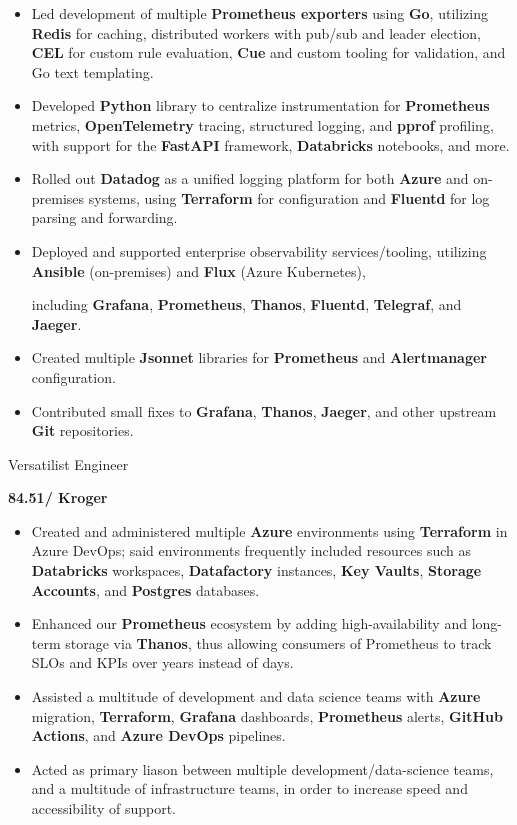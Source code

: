 \documentclass[10pt,a4paper,ragged2e,withhyper,hidelinks]{altacv}
\newcommand{\cveventinv}[4]{%
  {\large\color{emphasis}#1\par}
  \smallskip\normalsize
  \ifstrequal{#2}{}{}{
  \textbf{\color{accent}#2}\par
  \smallskip}
  \ifstrequal{#4}{}{}{{\small\color{emphasis}\makebox[0.25\linewidth][l]{\faMapMarker~#4}}}%
  \ifstrequal{#3}{}{}{{\small\color{emphasis}\makebox[0.25\linewidth][l]{\faCalendar~#3}}}\par
  \medskip\normalsize
}
\begin{document}
\begin{itemize}
    \item   \small{Led development of multiple \textbf{Prometheus exporters} using \textbf{Go}, utilizing \textbf{Redis} for caching, distributed workers with pub/sub and leader election, \textbf{CEL} for custom rule evaluation, \textbf{Cue} and custom tooling for validation, and Go text templating.}
    \item   \small{Developed \textbf{Python} library to centralize instrumentation for \textbf{Prometheus} metrics, \textbf{OpenTelemetry} tracing, structured logging, and \textbf{pprof} profiling, with support for the \textbf{FastAPI} framework, \textbf{Databricks} notebooks, and more.}
    \item   \small{Rolled out \textbf{Datadog} as a unified logging platform for both \textbf{Azure} and on-premises systems, using \textbf{Terraform} for configuration and \textbf{Fluentd} for log parsing and forwarding.}
    \item   \small{Deployed and supported enterprise observability services/tooling, utilizing \textbf{Ansible} (on-premises) and \textbf{Flux} (Azure Kubernetes), \par including \textbf{Grafana}, \textbf{Prometheus}, \textbf{Thanos}, \textbf{Fluentd}, \textbf{Telegraf}, and \textbf{Jaeger}.}
    \item   \small{Created multiple \textbf{Jsonnet} libraries for \textbf{Prometheus} and \textbf{Alertmanager} configuration.}
    \item   \small{Contributed small fixes to \textbf{Grafana}, \textbf{Thanos}, \textbf{Jaeger}, and other upstream \textbf{Git} repositories.}
\end{itemize}

\medskip\divider

\cveventinv{Versatilist Engineer}{84.51\degree / Kroger}{January 2020 -- March 2021}{Cincinnati, Ohio}

\begin{itemize}
    \item   \small{Created and administered multiple \textbf{Azure} environments using \textbf{Terraform} in Azure DevOps; said environments frequently included resources such as \textbf{Databricks} workspaces, \textbf{Datafactory} instances, \textbf{Key Vaults}, \textbf{Storage Accounts}, and \textbf{Postgres} databases.}
    \item   \small{Enhanced our \textbf{Prometheus} ecosystem by adding high-availability and long-term storage via \textbf{Thanos}, thus allowing consumers of Prometheus to track SLOs and KPIs over years instead of days.}
    \item   \small{Assisted a multitude of development and data science teams with \textbf{Azure} migration, \textbf{Terraform}, \textbf{Grafana} dashboards, \textbf{Prometheus} alerts, \textbf{GitHub Actions}, and \textbf{Azure DevOps} pipelines.}
    \item   \small{Acted as primary liason between multiple development/data-science teams, and a multitude of infrastructure teams, in order to increase speed and accessibility of support.}
\end{itemize}
\end{document}
